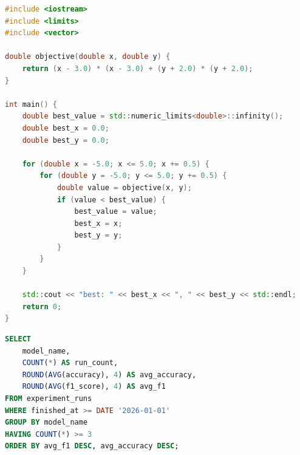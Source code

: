 \begin{lstlisting}[language=C++,caption={search.cpp/网格搜索代码},label={lst:appendix-grid}]
#include <iostream>
#include <limits>
#include <vector>

double objective(double x, double y) {
    return (x - 3.0) * (x - 3.0) + (y + 2.0) * (y + 2.0);
}

int main() {
    double best_value = std::numeric_limits<double>::infinity();
    double best_x = 0.0;
    double best_y = 0.0;

    for (double x = -5.0; x <= 5.0; x += 0.5) {
        for (double y = -5.0; y <= 5.0; y += 0.5) {
            double value = objective(x, y);
            if (value < best_value) {
                best_value = value;
                best_x = x;
                best_y = y;
            }
        }
    }

    std::cout << "best: " << best_x << ", " << best_y << std::endl;
    return 0;
}
\end{lstlisting}

\begin{lstlisting}[language=SQL,caption={report.sql/实验结果汇总代码},label={lst:appendix-sql}]
SELECT
    model_name,
    COUNT(*) AS run_count,
    ROUND(AVG(accuracy), 4) AS avg_accuracy,
    ROUND(AVG(f1_score), 4) AS avg_f1
FROM experiment_runs
WHERE finished_at >= DATE '2026-01-01'
GROUP BY model_name
HAVING COUNT(*) >= 3
ORDER BY avg_f1 DESC, avg_accuracy DESC;
\end{lstlisting}
